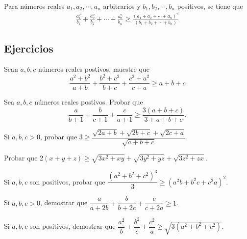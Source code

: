 \begin{theorem}
    Para números reales $a_1, a_2, \cdots, a_n$ arbitrarios y $b_1, b_2, \cdots, b_n$ positivos, se tiene que
    \begin{gather*}
        \boxed
        {
            \frac{a_1^2}{b_1} + \frac{a_2^2}{b_2} + \cdots + \frac{a_n^2}{b_n} \geq \frac{\left(a_1 + a_2 + \cdots + a_n\right)^2}{ \left(b_1 + b_2 + \cdots + b_n\right)}
        }
    \end{gather*}
\end{theorem}


\subsection{Ejercicios}

\begin{exercise}
    Sean $a, b, c$ números reales postivos, muestre que
    \[\frac{a^2 + b^2}{a + b} + \frac{b^2 + c^2}{b + c} + \frac{c^2 + a^2}{c + a} \geq a + b + c\]
\end{exercise}

\begin{exercise}
    Sea $a, b, c$ números reales postivos.
    Probar que
    \[\dfrac{a}{b + 1} + \dfrac{b}{c + 1} + \dfrac{c}{a + 1} \geq \dfrac{3(a + b + c)}{3 + a + b + c}.\]
\end{exercise}

\begin{exercise}
    Si $a, b, c > 0$, probar que $3 \geq \dfrac{\sqrt {2a + b} + \sqrt {2b + c} + \sqrt {2c + a}}{\sqrt {a + b + c}}$.
\end{exercise}

\begin{exercise}
    Probar que $2(x + y + z) \geq \sqrt {3x^2 + xy} + \sqrt {3y^2 + yz} + \sqrt {3z^2 + zx}$.
\end{exercise}

\begin{exercise}
    Si $a, b, c$ son positivos, probar que $\dfrac{(a^2 + b^2 + c^2)^3}{3} \geq (a^2 b + b^2 c + c^2 a)^2$.
\end{exercise}

\begin{exercise}
    Si $a, b, c > 0$, demostrar que $\dfrac{a}{a + 2b} + \dfrac{b}{b + 2c} + \dfrac{c}{c + 2a} \geq 1$.
\end{exercise}

\begin{exercise}
    Si $a, b, c$ son positivos, demostrar que $\dfrac{a^2}{b} + \dfrac{b^2}{c} + \dfrac{c^2}{a} \geq \sqrt {3(a^2 + b^2 + c^2)}$.
\end{exercise}

